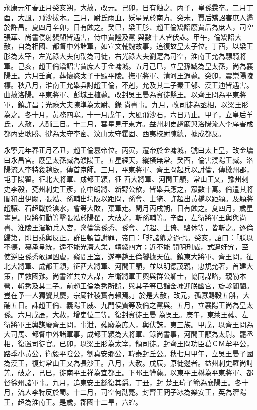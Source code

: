 \begin{pinyinscope}
 永康元年春正月癸亥朔，大赦，改元。己卯，日有蝕之。丙子，皇孫霖卒。二月丁酉，大風，飛沙拔木。三月，尉氏雨血，妖星見於南方。癸未，賈后矯詔害庶人遹於許昌。夏四月辛卯，日有蝕之。癸巳，梁王肜、趙王倫矯詔廢賈后為庶人，司空張華、尚書僕射裴頠皆遇害，侍中賈謐及黨
 與數十人皆伏誅。甲午，倫矯詔大赦，自為相國、都督中外諸軍，如宣文輔魏故事，追復故皇太子位。丁酉，以梁王肜為太宰，左光祿大夫何劭為司徒，右光祿大夫劉寔為司空，淮南王允為驃騎將軍。己亥，趙王倫矯詔害賈庶人于金墉城。五月己巳，立皇孫臧為皇太孫，尚為襄陽王。六月壬寅，葬懷愍太子于顯平陵。撫軍將軍、清河王遐薨。癸卯，震崇陽陵標。秋八月，淮南王允舉兵討趙王倫，不剋，允及其二子秦王郁、漢王迪皆遇害。曲赦洛陽。平東將軍、彭城王植薨。改封吳王晏為賓徒縣王。以齊王冏為平東將軍，鎮許昌；光祿大夫陳準為太尉、錄
 尚書事。九月，改司徒為丞相，以梁王肜為之。冬十月，黃務四塞。十一月戊午，大風飛沙石，六日乃止。甲子，立皇后羊氏，大赦，大酺三日。十二月，彗星見于東方。益州刺史趙廞與洛陽流人李庠害成都內史耿勝、犍為太守李密、汶山太守霍固、西夷校尉陳總，據成都反。



 永寧元年春正月乙丑，趙王倫篡帝位。丙寅，遷帝於金墉城，號曰太上皇，改金墉曰永昌宮。廢皇太孫臧為濮陽王。五星經天，縱橫無常。癸酉，倫害濮陽王臧。洛陽流人李特殺趙廞，傳首京師。三月，平東將軍、齊王冏起兵以討倫，傳檄州郡，屯于陽翟。征北大將軍、成都王穎，征
 西大將軍、河間王顒，常山王乂，豫州刺史李毅，兗州刺史王彥，南中朗將、新野公歆，皆舉兵應之，眾數十萬。倫遣其將閭和出伊闕，張泓、孫輔出堮阪以距冏，孫會、士猗、許超出黃橋以距潁。及穎將趙驤、石超戰於溴水，會等大敗，棄軍走。閏月丙戌朔，日有蝕之。夏四月，歲星晝見。冏將何勖等擊張泓於陽翟，大破之，斬孫輔等。辛酉，左衛將軍王輿與尚書、淮陵王漼勒兵入宮，禽倫黨孫秀、孫會、許超、士猗、駱休等，皆斬之。逐倫歸第，即日乘輿反正。群臣頓首謝罪，帝曰：「非諸卿之過也。癸亥，詔曰：「朕以不德，纂承皇統，遠不能光濟大業，靖綏四方；近不能
 開明刑威，式遏奸宄，至使逆臣孫秀敢肆凶虐，窺間王室，遂奉趙王倫饕據天位。鎮東大將軍、齊王冏，征北大將軍、成都王穎，征西大將軍、河間王顒，並以明德茂親，忠規允著，首建大策，匡救國難。尚書漼共立大謀，左衛將軍王輿與群公卿士，協同謀略，親勒本營，斬秀及其二子。前趙王倫為秀所誤，與其子等已詣金墉迎朕幽宮，旋軫閶闔。豈在予一人獨饗其慶，宗廟社稷實有賴焉。」於是大赦，改元，孤寡賜穀五斛，大酺五日。誅趙王倫、義陽王威、九門侯質等及倫之黨與。五月，立襄陽王尚為皇太孫。六月戌辰，大赦，增吏位二等。復封賓徒王晏
 為吳王。庚午，東萊王蕤、左衛將軍王輿謀廢齊王冏，事泄，蕤廢為庶人，輿伏誅，夷三族。甲戌，以齊王冏為大司馬、都督中外諸軍事，成都王潁為大將軍、錄尚書事，河間王顒為太尉。罷丞相，復置司徒官。已卯，以梁王肜為太宰，領司徒。封齊王冏功臣葛ＣＭ牟平公，路季小黃公，衛毅平陰公，劉真安鄉公，韓泰封丘公。秋七月甲午，立吳王晏子國為漢王，復封常山王乂為長沙王。八月，大赦。戊辰，原徙邊者。益州刺史羅尚討羌，破之，己巳，徙南平王祥為宜都王。下邳王韡薨。以東平王楙為平東將軍、都督徐州諸軍事。九月，追東安王繇復其爵。丁丑，封
 楚王瑋子範為襄陽王。冬十月，流人李特反於蜀。十二月，司空何劭薨。封齊王冏子冰為樂安王，英為濟陽王，超為淮南王。是歲，郡國十二旱，六蝗。




\end{pinyinscope}

